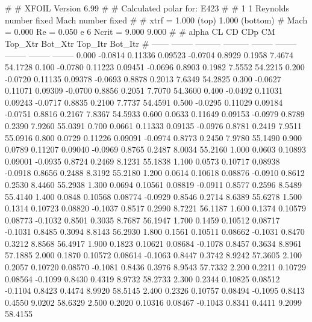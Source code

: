 #  
#       XFOIL         Version 6.99
#  
# Calculated polar for: E423                                            
#  
# 1 1 Reynolds number fixed          Mach number fixed         
#  
# xtrf =   1.000 (top)        1.000 (bottom)  
# Mach =   0.000     Re =     0.050 e 6     Ncrit =   9.000  9.000
#  
#   alpha    CL        CD       CDp       CM     Top_Xtr  Bot_Xtr  Top_Itr  Bot_Itr
#  ------ -------- --------- --------- -------- -------- -------- -------- --------
   0.000  -0.0814   0.11336   0.09523  -0.0704   0.8929   0.1958   7.4674  54.1728
   0.100  -0.0780   0.11223   0.09451  -0.0696   0.8903   0.1982   7.5552  54.2215
   0.200  -0.0720   0.11135   0.09378  -0.0693   0.8878   0.2013   7.6349  54.2825
   0.300  -0.0627   0.11071   0.09309  -0.0700   0.8856   0.2051   7.7070  54.3600
   0.400  -0.0492   0.11031   0.09243  -0.0717   0.8835   0.2100   7.7737  54.4591
   0.500  -0.0295   0.11029   0.09184  -0.0751   0.8816   0.2167   7.8367  54.5933
   0.600   0.0633   0.11649   0.09153  -0.0979   0.8789   0.2390   7.9260  55.0391
   0.700   0.0661   0.11333   0.09135  -0.0976   0.8781   0.2419   7.9511  55.0916
   0.800   0.0729   0.11226   0.09091  -0.0974   0.8773   0.2450   7.9780  55.1490
   0.900   0.0789   0.11207   0.09040  -0.0969   0.8765   0.2487   8.0034  55.2160
   1.000   0.0603   0.10893   0.09001  -0.0935   0.8724   0.2469   8.1231  55.1838
   1.100   0.0573   0.10717   0.08938  -0.0918   0.8656   0.2488   8.3192  55.2180
   1.200   0.0614   0.10618   0.08876  -0.0910   0.8612   0.2530   8.4460  55.2938
   1.300   0.0694   0.10561   0.08819  -0.0911   0.8577   0.2596   8.5489  55.4140
   1.400   0.0848   0.10568   0.08774  -0.0929   0.8546   0.2714   8.6389  55.6278
   1.500   0.1314   0.10723   0.08820  -0.1037   0.8517   0.2990   8.7221  56.1187
   1.600   0.1374   0.10579   0.08773  -0.1032   0.8501   0.3035   8.7687  56.1947
   1.700   0.1459   0.10512   0.08717  -0.1031   0.8485   0.3094   8.8143  56.2930
   1.800   0.1561   0.10511   0.08662  -0.1031   0.8470   0.3212   8.8568  56.4917
   1.900   0.1823   0.10621   0.08684  -0.1078   0.8457   0.3634   8.8961  57.1885
   2.000   0.1870   0.10572   0.08614  -0.1063   0.8447   0.3742   8.9242  57.3605
   2.100   0.2057   0.10720   0.08570  -0.1081   0.8436   0.3976   8.9543  57.7332
   2.200   0.2211   0.10729   0.08564  -0.1099   0.8430   0.4319   8.9732  58.2733
   2.300   0.2344   0.10825   0.08512  -0.1104   0.8423   0.4474   8.9920  58.5145
   2.400   0.2326   0.10757   0.08494  -0.1095   0.8413   0.4550   9.0202  58.6329
   2.500   0.2020   0.10316   0.08467  -0.1043   0.8341   0.4411   9.2099  58.4155
